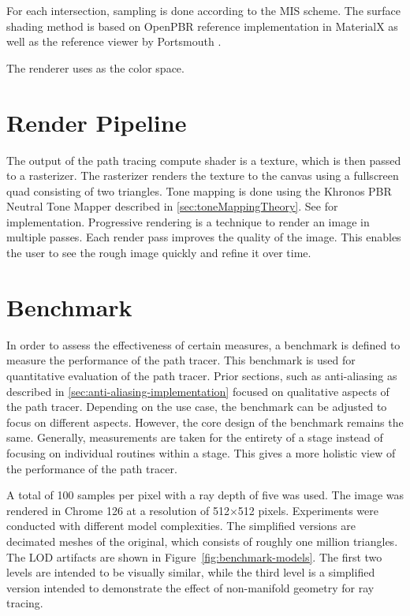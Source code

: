 For each intersection, sampling is done according to the \gls{MIS} scheme. The surface shading method is based on \gls{OpenPBR} reference implementation in \gls{MaterialX} as well as the reference viewer by Portsmouth \cite{openPbrViewer}.

The renderer uses  as the color space.

\section{Render Pipeline}

The output of the path tracing compute shader is a texture, which is then passed to a rasterizer. The rasterizer renders the texture to the canvas using a fullscreen quad consisting of two triangles. Tone mapping is done using the Khronos PBR Neutral Tone Mapper described in \autoref{sec:toneMappingTheory}. See  for implementation. Progressive rendering is a technique to render an image in multiple passes. Each render pass improves the quality of the image. This enables the user to see the rough image quickly and refine it over time. 

\section{Benchmark}
\label{sec:benchmark}

In order to assess the effectiveness of certain measures, a benchmark is defined to measure the performance of the path tracer. This benchmark is used for quantitative evaluation of the path tracer. Prior sections, such as anti-aliasing as described in \autoref{sec:anti-aliasing-implementation} focused on qualitative aspects of the path tracer. Depending on the use case, the benchmark can be adjusted to focus on different aspects. However, the core design of the benchmark remains the same. Generally, measurements are taken for the entirety of a stage instead of focusing on individual routines within a stage. This gives a more holistic view of the performance of the path tracer.

A total of 100 samples per pixel with a ray depth of five was used. The image was rendered in Chrome 126 at a resolution of 512$\times$512 pixels. Experiments were conducted with different model complexities. The simplified versions are decimated meshes of the original, which consists of roughly one million triangles. The LOD artifacts are shown in Figure~\ref{fig:benchmark-models}. The first two levels are intended to be visually similar, while the third level is a simplified version intended to demonstrate the effect of non-manifold geometry for ray tracing.

